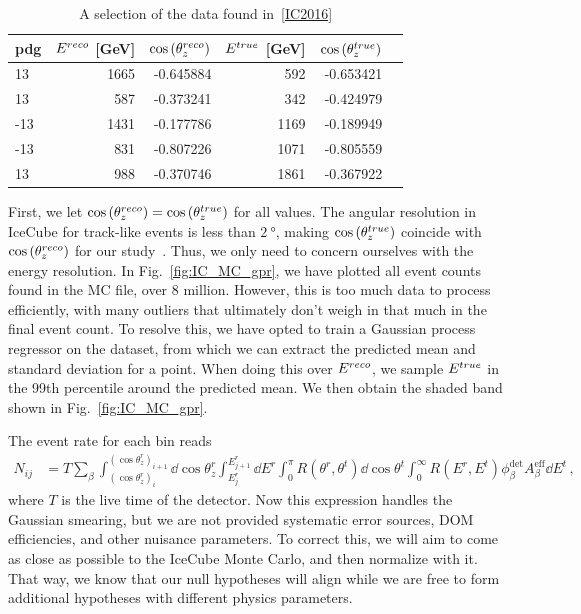 \begin{table}[ht]
    \centering
    \begin{tabular}{lrrrrr}
        \hline \hline
        pdg &      $E^{reco}$ [\si{\GeV}] &     $\cos{(\theta_z^{reco})}$ &       $E^{true}$ [\si{\GeV}] &     $\cos{(\theta_z^{true})}$ \\
        \hline
         13 &  1665 & -0.645884 &    592 & -0.653421 \\
         13 &   587 & -0.373241 &    342 & -0.424979 \\
        -13 &  1431 & -0.177786 &   1169 & -0.189949 \\
        -13 &   831 & -0.807226 &   1071 & -0.805559 \\
         13 &   988 & -0.370746 &   1861 & -0.367922 \\
         \hline \hline
  \end{tabular}
  \caption{A selection of the data found in~\ref{IC2016}}
  \label{table:IC_MC}
\end{table}

First, we let $\cos{(\theta_z^{reco})} = \cos{(\theta_z^{true})}$ for all values. The angular resolution in IceCube for track-like events is less than $\SI{2}{\degree}$, making $\cos{(\theta_z^{true})}$ coincide with $\cos{(\theta_z^{reco})}$ for our study~\cite{IC2020}.
Thus, we only need to concern ourselves with the energy resolution.
In Fig.~\ref{fig:IC_MC_gpr}, we have plotted all event counts found in the MC file, over 8 million. However, this is too much data to process efficiently, with many outliers that ultimately don't weigh in 
that much in the final event count. To resolve this, we have opted to train a Gaussian process regressor on the dataset, from which we can extract the predicted mean and standard deviation for a point.
When doing this over $E^{reco}$, we sample $E^{true}$ in the 99th percentile around the predicted mean. We then obtain the shaded band shown in Fig.~\ref{fig:IC_MC_gpr}. %

The event rate for each bin reads
\begin{align}\label{eq:ICevents}
    N_{ij} &= T \sum_\beta\int_{(\cos{\theta_z^r})_i}^{(\cos{\theta_z^r})_{i+1}} \dd \cos{\theta^r_z} \int_{E^r_{j}}^{E^r_{j+1}} \dd E^r 
    \int_0^\pi R(\theta^r,\theta^t) \dd \cos{\theta^t} \int_0^\infty R(E^r,E^t) \phi_\beta^\text{det}  A^\text{eff}_\beta \dd E^t
    \,,
\end{align}
where $T$ is the live time of the detector. Now this expression handles the Gaussian smearing, but we are not provided systematic error sources, DOM efficiencies, and other nuisance parameters. To correct this,
we will aim to come as close as possible to the IceCube Monte Carlo, and then normalize with it. That way, we know that our null hypotheses will align while we are free to form additional hypotheses with different 
physics parameters. %


